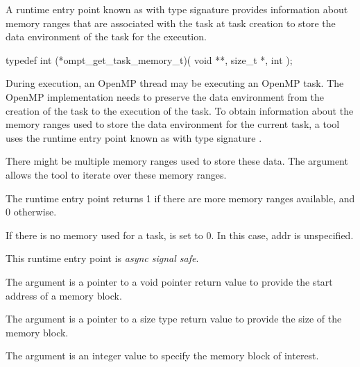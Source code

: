 \summary
A runtime entry point known as  
with type signature  provides information 
about memory ranges that are associated with the task at task creation
to store the data environment of the task for the execution.

\format
\begin{ccppspecific}
\begin{omptInquiry}
typedef int (*ompt_get_task_memory_t)(
  void **,
  size_t *,
  int 
);
\end{omptInquiry}
\end{ccppspecific}

\descr

During execution, an OpenMP thread may be executing an OpenMP task.
The OpenMP implementation needs to preserve the data environment
from the creation of the task to the execution of the task.
To obtain information about the memory ranges used to store the 
data environment for the current task, 
a tool uses the runtime entry point known as
with type signature . 

There might be multiple memory ranges used to store these data. The
 argument allows the tool to iterate over these memory ranges.

The  runtime entry point
returns 1 if there are more memory ranges available, and 0 otherwise. 

If there is no memory used for a task,  is set to 0. 
In this case, addr is unspecified.

This runtime entry point is \emph{async signal safe}.

\argdesc

The argument  is a pointer to a void pointer return value
to provide the start address of a memory block.  

The argument  is a pointer to a size type return
value to provide the size of the memory block.

The argument  is an integer value to specify the
memory block of interest.

%

\label{sec:ompt_get_target_info_t}
\label{sec:ompt_get_target_info}

